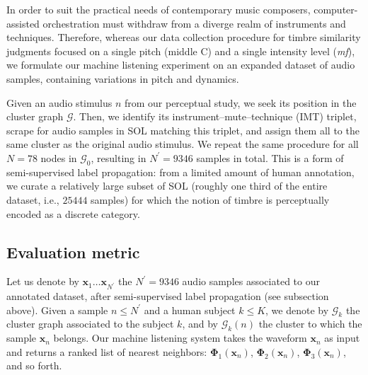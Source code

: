 \documentclass{bmcart}
\begin{document}
In order to suit the practical needs of contemporary music composers, computer-assisted orchestration must withdraw from a diverge realm of instruments and techniques.
Therefore, whereas our data collection procedure for timbre similarity judgments focused on a single pitch (middle C) and a single intensity level (\emph{mf}), we formulate our machine listening experiment on an expanded dataset of audio samples, containing variations in pitch and dynamics.

Given an audio stimulus $n$ from our perceptual study, we seek its position in the cluster graph $\mathcal{G}$.
Then, we identify its instrument--mute--technique (IMT) triplet, scrape for audio samples in SOL matching this triplet, and assign them all to the same cluster as the original audio stimulus.
We repeat the same procedure for all $N=78$ nodes in $\mathcal{G}_0$, resulting in $N^\prime = 9346$ samples in total.
This is a form of semi-supervised label propagation: from a limited amount of human annotation, we curate a relatively large subset of SOL (roughly one third of the entire dataset, i.e., $25444$ samples) for which the notion of timbre is perceptually encoded as a discrete category.



\subsection*{Evaluation metric}

Let us denote by $\boldsymbol{x}_1 \ldots \boldsymbol{x}_{{N}^{\prime}}$ the $N^{\prime}=9346$ audio samples associated to our annotated dataset, after semi-supervised label propagation (see subsection above).
Given a sample $n\leq N^{\prime}$ and a human subject $k\leq K$, we denote by $\mathcal{G}_k$ the cluster graph associated to the subject $k$, and by $\mathcal{G}_k (n)$ the cluster to which the sample $\boldsymbol{x}_{n}$ belongs.
Our machine listening system takes the waveform $\boldsymbol{x}_{n}$ as input and returns a ranked list of nearest neighbors: $\mathbf{\Phi}_1 (\boldsymbol{x}_n)$, $\mathbf{\Phi}_2 (\boldsymbol{x}_n)$, $\mathbf{\Phi}_3 (\boldsymbol{x}_n)$, and so forth.
\end{document}
